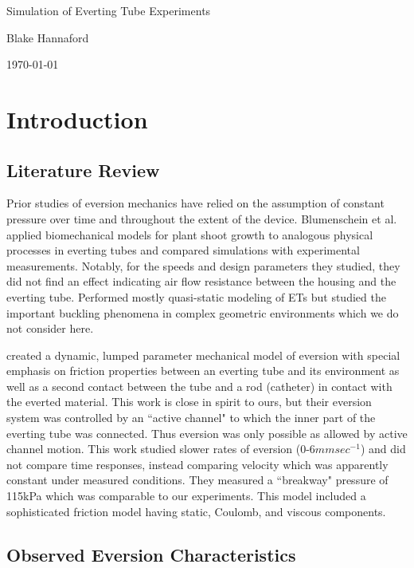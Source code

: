 \documentclass[letterpaper]{article}
\begin{document}
\begin{centering}
{\Large   Simulation of Everting Tube Experiments}

Blake Hannaford

\today

\end{centering}

\section{Introduction}

\subsection{Literature Review}

Prior studies of eversion mechanics have relied on the assumption of constant
pressure over time and throughout the extent of the device.
Blumenschein et al.\cite{blumenschein2017modeling}
applied biomechanical models for plant shoot growth to analogous physical
processes in everting tubes and compared simulations with experimental measurements.
Notably, for the speeds and design parameters they studied, they did not find an
effect indicating air flow resistance between the housing and  the everting tube.
\cite{Hawkes2017} Performed mostly quasi-static modeling of ETs
but studied the important buckling phenomena in complex geometric
environments which we do not consider here.

\cite{vartholomeos2024lumped} created a dynamic, lumped parameter
mechanical model
of eversion with special emphasis on friction properties between
an everting tube and its environment as well as a second contact
between the tube and a rod (catheter) in contact with the
everted material.  This work is close in spirit to ours, but
their eversion system was controlled by an ``active channel" to which the inner
part of the everting tube was connected.   Thus eversion was only possible as allowed
by active channel motion.  This work studied
slower rates of eversion (0-6$mm sec^{-1}$) and did not compare time responses, instead
comparing velocity which was apparently constant under measured conditions.
They measured a ``breakway" pressure of 115kPa which was comparable to our experiments.
This model included a sophisticated friction model having static, Coulomb, and viscous
components.

\subsection{Observed Eversion Characteristics}
\end{document}

